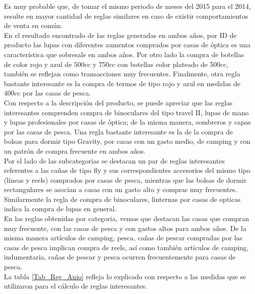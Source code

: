 \documentclass[]{article}
\begin{document}
	Es muy probable que, de tomar el mismo periodo de meses del 2015 para el 2014, resulte en mayor cantidad de reglas similares en caso de existir comportamientos de venta en común.\\
	
	En el resultado encontrado de las reglas generadas en ambos años, por ID de producto las lupas con diferentes aumentos comprados por casas de óptica es una característica que sobresale en ambos años. Por otro lado la compra de botellas de color rojo y azul de 500cc y 750cc con botellas color plateado de 500cc, también se reflejan como transacciones muy frecuentes. Finalmente, otra regla bastante interesante es la compra de termos de tipo rojo y azul en medidas de 400cc por las casas de pesca.\\
	
	Con respecto a la descripción del producto, se puede apreciar que las reglas interesantes comprenden compra de binoculares del tipo travel II, lupas de mano y lupas profesionales por casas de óptica; de la misma manera, sombreros y capas por las casas de pesca. Una regla bastante interesante es la de la compra de bolsas para dormir tipo Gravity, por casas con un gasto medio, de camping y con un patrón de compra frecuente en ambos años.\\
	
	Por el lado de las subcategorias se destacan un par de reglas interesantes referentes a las cañas de tipo fly y sus correspondientes accesorios del mismo tipo (líneas y reels) comprados por casas de pesca, mientras que las bolsas de dormir rectangulares se asocian a casas con un gasto alto y compras muy frecuentes. Similarmente la regla de compra de binoculares, linternas por casas de opticas indica la compra de lupas en general.\\
	
	En las reglas obtenidas por categoria, vemos que destacan las casas que compran muy frecuente, con las casas de pesca y con gastos altos para ambos años. De la misma manera artículos de camping, pesca, cañas de pescar compradas por las casas de pesca implican compra de reels, así como también artículos de camping, indumentaria, cañas de pescar y pesca ocurren frecuentemente para casas de pesca.\\
	
	La tabla \ref{Tab_Reg_Anio} refleja lo explicado con respecto a las medidas que se utilizaron para el cálculo de reglas interesantes.
	
\end{document}
